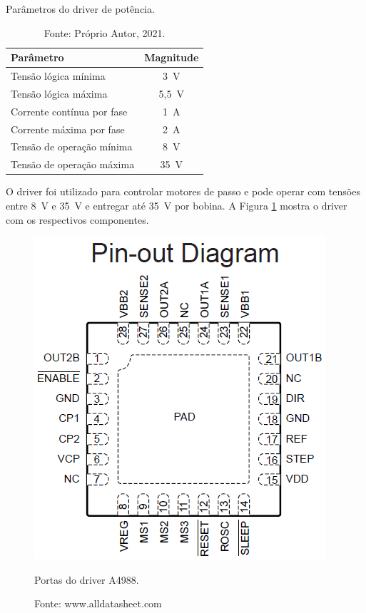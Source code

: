 \begin{table}[H]
    \centering
    \caption{Parâmetros do driver de potência.}
    \begin{tabular}{lc}
        \hline
        \textbf{Parâmetro} & \textbf{Magnitude}\\
        \hline
        Tensão lógica mínima & 3~V\\
        Tensão lógica máxima & 5,5~V\\
        Corrente contínua por fase & 1~A\\
        Corrente máxima por fase & 2~A\\
        Tensão de operação mínima & 8~V\\
        Tensão de operação máxima & 35~V\\ 
        \hline       
    \end{tabular}
    \caption*{Fonte: Próprio Autor, 2021.}
    \label{tab:pdriver}
\end{table}
    
O driver foi utilizado para controlar motores de passo e pode operar com tensões entre 8~V e 35~V e 
entregar até 35~V por bobina. A Figura \ref{fig:driverportas} mostra o driver com os respectivos componentes.

\begin{figure}[H]
\centering
\includegraphics[width = 0.7\linewidth]{figuras/driverportas}
\caption{Portas do driver A4988.}
\caption*{Fonte: www.alldatasheet.com}
\label{fig:driverportas}
\end{figure}
    
